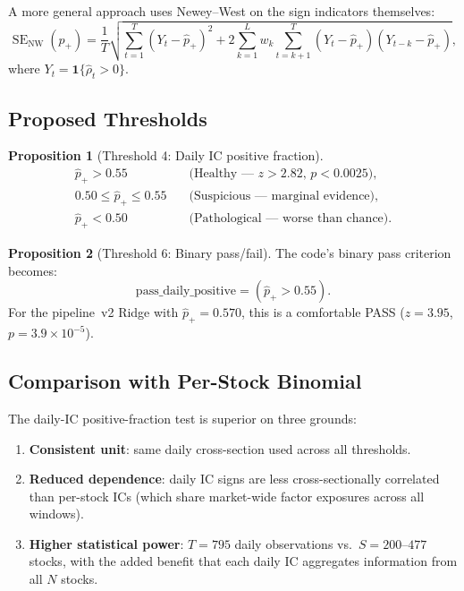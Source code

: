 \documentclass[11pt,a4paper]{article}
\theoremstyle{definition}
\newtheorem{proposition}{Proposition}[section]
\newcommand{\SE}{\operatorname{SE}}
\begin{document}
A more general approach uses Newey--West on the sign indicators
themselves:
\begin{equation}
    \SE_{\text{NW}}(\hat{p}_{+}) =
    \frac{1}{T}\sqrt{\sum_{t=1}^{T}(Y_{t}-\hat{p}_{+})^{2}
                     + 2\sum_{k=1}^{L} w_{k}\sum_{t=k+1}^{T}
                       (Y_{t}-\hat{p}_{+})(Y_{t-k}-\hat{p}_{+})},
\end{equation}
where $Y_{t} = \mathbf{1}\{\hat{\rho}_{t} > 0\}$.

\subsection{Proposed Thresholds}

\begin{proposition}[Threshold 4: Daily IC positive fraction]
\label{prop:thresh4}
\begin{align}
    \boxed{\hat{p}_{+} > 0.55} &\quad\text{(Healthy --- $z > 2.82$, $p < 0.0025$)}, \\
    \boxed{0.50 \leq \hat{p}_{+} \leq 0.55} &\quad\text{(Suspicious --- marginal evidence)}, \\
    \boxed{\hat{p}_{+} < 0.50} &\quad\text{(Pathological --- worse than chance)}.
\end{align}
\end{proposition}

\begin{proposition}[Threshold 6: Binary pass/fail]
\label{prop:thresh6}
The code's binary pass criterion becomes:
\begin{equation}
    \boxed{\text{pass\_daily\_positive} = (\hat{p}_{+} > 0.55)}.
\end{equation}
For the pipeline~v2 Ridge with $\hat{p}_{+}=0.570$, this is a
comfortable PASS ($z=3.95$, $p = 3.9\times10^{-5}$).
\end{proposition}

\subsection{Comparison with Per-Stock Binomial}

The daily-IC positive-fraction test is superior on three grounds:
\begin{enumerate}[nosep]
    \item \textbf{Consistent unit}: same daily cross-section used across
          all thresholds.
    \item \textbf{Reduced dependence}: daily IC signs are less
          cross-sectionally correlated than per-stock ICs (which share
          market-wide factor exposures across all windows).
    \item \textbf{Higher statistical power}: $T=795$ daily observations
          vs.\ $S=200$--$477$ stocks, with the added benefit that each
          daily IC aggregates information from all $N$ stocks.
\end{enumerate}
\end{document}
